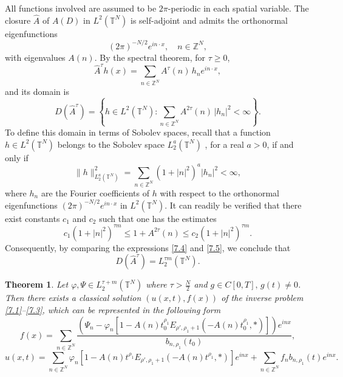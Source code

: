 \documentclass[12pt, reqno]{amsart}
\newtheorem{theorem}{Theorem}[section]
\theoremstyle{definition}
\theoremstyle{remark}
\numberwithin{equation}{section}
\begin{document}
All functions involved are assumed to be $2\pi$-periodic in each spatial variable. The closure
$\widehat{A}$ of $A(D)$ in $L^2(\mathbb{T}^N)$ is self-adjoint and admits the orthonormal
eigenfunctions
\[
(2\pi)^{-N/2} e^{i n\cdot x}, \quad n\in\mathbb{Z}^N,
\]
with eigenvalues $A(n)$. By the spectral theorem, for $\tau\ge0$, 
\[
\widehat{A}^\tau h(x)=\sum_{n\in\mathbb{Z}^N} A^\tau(n)\, h_n e^{i n\cdot x},
\]
and its domain is
\begin{equation}\label{7.4}
D(\widehat{A}^\tau)=
\left\{
h\in L^2(\mathbb{T}^N):
\sum_{n\in\mathbb{Z}^N} A^{2\tau}(n)\, |h_n|^2<\infty
\right\}.
\end{equation}
To define this domain in terms of Sobolev spaces, recall that a function $h\in L^2(\mathbb{T}^N)$ belongs to the Sobolev space $L^a_2(\mathbb{T}^N)$ \cite{28}, for a real $a>0$, if and only if 
\begin{equation}\label{7.5}
\|h\|_{L^a_2(\mathbb{T}^N)}^2
=
\sum_{n\in \mathbb{Z}^N} (1 + |n|^2)^{a} |h_n|^2 < \infty,
\end{equation}
where $h_n$ are the Fourier coefficients of $h$ with respect to the orthonormal eigenfunctions
$(2\pi)^{-N/2} e^{i n \cdot x}$ in $L^2(\mathbb{T}^N)$. 
It can readily be verified that there exist constants $c_1$ and $c_2$ such that one has the estimates
\[
c_1 \left( 1 + |n|^2 \right)^{\tau m}
\le
1 + A^{2 \tau} (n)
\le
c_2 \left( 1 + |n|^2 \right)^{\tau m}.
\]
Consequently, by comparing the expressions \eqref{7.4} and \eqref{7.5}, we conclude that 
$$
D(\widehat{A}^\tau) = L^{\tau m}_2(\mathbb{T}^N).
$$
\begin{theorem}\label{theorem5}
Let $\varphi, \Psi \in L_2^{\tau +m}(\mathbb{T}^N)$ where $\tau>\frac{N}{2}$ and $g\in C[0,T], \, g(t)\neq 0$.
Then there exists a classical solution $(u(x,t), f(x))$ of the inverse problem \eqref{7.1}--\eqref{7.3}, which can be represented in the following form      
$$
    f(x)=\sum_{n\in \mathbb{Z}^N} \frac{\left(\Psi_n-\varphi_n \left[ 1 - A(n) t_0^{\rho_1} E_{ \rho', \rho_1 + 1} \left( -A(n) t_0^{\rho_1}, * \right) \right]\right)e^{inx}  }{b_{n,\rho_1}(t_0)},
    $$
    $$
    u(x,t)= \sum_{n\in \mathbb{Z}^N}\varphi_n \left[ 1 - A(n) t^{\rho_1} E_{ \rho', \rho_1 + 1} \left( -A(n) t^{\rho_1}, * \right) \right]e^{inx}+\sum_{n\in\mathbb{Z}^N}f_
    n b_{n,\rho_1}(t) e^{inx}.
    $$
\end{theorem}
\end{document}
